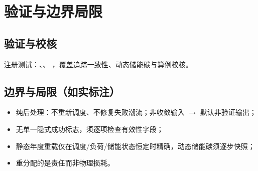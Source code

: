 \documentclass[UTF8,fontset=fandol,a4paper,11pt]{ctexart}
\begin{document}
\section{验证与边界局限}
\subsection{验证与校核}
注册测试：、、
，覆盖追踪一致性、动态储能碳与算例校核。

\subsection{边界与局限（如实标注）}
\begin{itemize}
  \item 纯后处理：不重新调度、不修复失败潮流；非收敛输入 $\to$ 默认非验证输出；
  \item 无单一隐式成功标志，须逐项检查有效性字段；
  \item 静态年度重载仅在调度/负荷/储能状态恒定时精确，动态储能碳须逐步快照；
  \item {} 重分配的是责任而非物理损耗。
\end{itemize}




\end{document}
